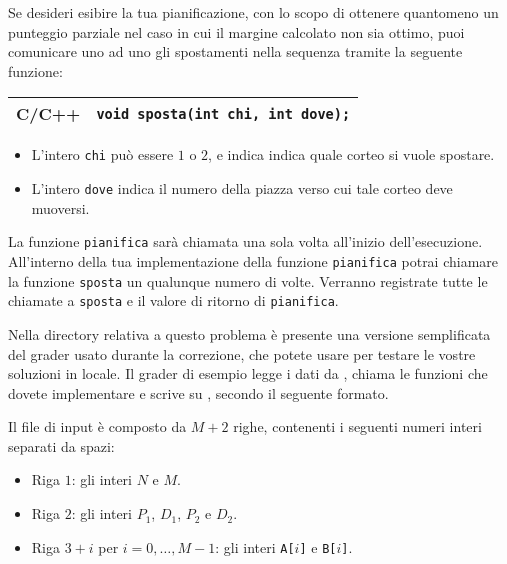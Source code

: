 \medskip

Se desideri esibire la tua pianificazione,
con lo scopo di ottenere quantomeno un punteggio parziale
nel caso in cui il margine calcolato non sia ottimo,
puoi comunicare uno ad uno gli spostamenti nella sequenza tramite la seguente funzione:

\begin{center}\begin{tabularx}{\textwidth}{|c|X|}
\hline
C/C++  & \verb|void sposta(int chi, int dove);|\\
\hline
\end{tabularx}\end{center}

\begin{itemize}[nolistsep]
	\item L'intero \texttt{chi} può essere $1$ o $2$, e indica indica quale corteo si vuole spostare.
  \item L'intero \texttt{dove} indica il numero della piazza verso cui tale corteo deve muoversi.
\end{itemize}

La funzione \texttt{pianifica} sarà chiamata una sola volta all'inizio dell'esecuzione.
All'interno della tua implementazione della funzione \texttt{pianifica}
potrai chiamare la funzione \texttt{sposta} un qualunque numero di volte.
Verranno registrate tutte le chiamate a \texttt{sposta} e il valore di ritorno di \texttt{pianifica}.



\Grader
Nella directory relativa a questo problema è presente una versione semplificata del grader usato durante la correzione, che potete usare per testare le vostre soluzioni in locale. Il grader di esempio legge i dati da , chiama le funzioni che dovete implementare e scrive su \outputfile{}, secondo il seguente formato.

Il file di input è composto da $M+2$ righe, contenenti i seguenti numeri interi separati da spazi:
\begin{itemize}[nolistsep,itemsep=2mm]
\item Riga $1$: gli interi $N$ e $M$.
\item Riga $2$: gli interi $P_1$, $D_1$, $P_2$ e $D_2$.
\item Riga $3+i$ per $i = 0, \ldots, M-1$: gli interi \texttt{A[$i$]} e \texttt{B[$i$]}.
\end{itemize}

